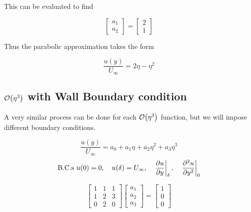 \documentclass{report}
\begin{document}
This can be evaluated to find

\begin{equation}
   \begin{bmatrix}
      a_1 \\
      a_2
   \end{bmatrix}
   =
   \begin{bmatrix}
      2 \\
      1
   \end{bmatrix}
\end{equation}

Thus the parabolic approximation takes the form

\begin{equation}
   \frac{u(y)}{U_{\infty}} = 2\eta - \eta^2
\end{equation}

\subsection{$\order{\eta^3}$ with Wall Boundary condition}

A very similar process can be done for each $\order{\eta^3}$ function, but we will impose different boundary conditions.

\begin{equation}
   \frac{u(y)}{U_{\infty}} = a_0 + a_1\eta + a_2\eta^2 + a_3\eta^3
   \label{parab}
\end{equation}
\begin{equation*}
   \text{B.C.s } u(0) = 0, \quad u(\delta) = U_{\infty}, \quad \eval{\pdv{u}{y}}_{\delta}, \quad \eval{\pdv[2]{u}{y}}_0
\end{equation*}

\begin{equation}
   \begin{bmatrix}
      1 & 1 & 1\\
      1 & 2 & 3 \\
      0 & 2 & 0
   \end{bmatrix}
   \begin{bmatrix}
      a_1 \\
      a_2 \\
      a_3
   \end{bmatrix} =
   \begin{bmatrix}
      1 \\
      0 \\
      0
   \end{bmatrix}
\end{equation}
\end{document}
